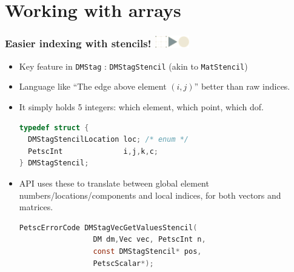\documentclass{beamer}
\newcommand\frametitlelogo[1]{\frametitle{#1\hspace{0pt plus 1 filll} \includegraphics[width=42pt]{logo_slides}}}
\begin{document}
\section{Working with arrays}

\begin{frame}[fragile]
\frametitlelogo{Easier indexing with stencils!}
\begin{itemize}
\item Key feature in \texttt{DMStag} : \lstinline{DMStagStencil} (akin to \lstinline{MatStencil})
\item Language like ``The edge above element $(i,j)$'' better than raw indices.
\item It simply holds 5 integers: which element, which point, which dof.
\begin{lstlisting}[language=C]
typedef struct {
  DMStagStencilLocation loc; /* enum */
  PetscInt              i,j,k,c;
} DMStagStencil;
\end{lstlisting}
\item API uses these to translate between global element numbers/locations/components
and local indices, for both vectors and matrices.
\begin{lstlisting}[language=C]
PetscErrorCode DMStagVecGetValuesStencil(
                 DM dm,Vec vec, PetscInt n,
                 const DMStagStencil* pos,
                 PetscScalar*);
\end{lstlisting}
\end{itemize}
\end{frame}
\end{document}

